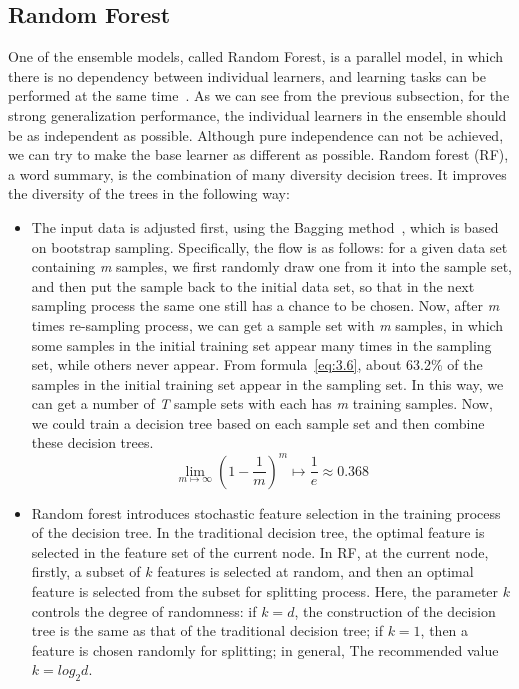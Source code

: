 \documentclass[master]{IPSstyle}
\begin{document}
{\subsection{Random Forest}
One of the ensemble models, called Random Forest, is a parallel model, in which there is no dependency between individual learners, and learning tasks can be performed at the same time~\cite{breiman2001random}. As we can see from the previous subsection, for the strong generalization performance, the individual learners in the ensemble should be as independent as possible. Although pure independence can not be achieved, we can try to make the base learner as different as possible. Random forest (RF), a word summary, is the combination of many diversity decision trees. It improves the diversity of the trees in the following way:
\begin{itemize}
\item The input data is adjusted first, using the Bagging method~\cite{breiman1996bagging}, which is based on bootstrap sampling. Specifically, the flow is as follows: for a given data set containing \textit{m} samples, we first randomly draw one from it into the sample set, and then put the sample back to the initial data set, so that in the next sampling process the same one still has a chance to be chosen. Now, after \textit{m} times re-sampling process, we can get a sample set with \textit{m} samples, in which some samples in the initial training set appear many times in the sampling set, while others never appear. From formula~\ref{eq:3.6}, about 63.2\% of the samples in the initial training set appear in the sampling set. In this way, we can get a number of \textit{T} sample sets with each has \textit{m} training samples. Now, we could train a decision tree based on each sample set and then combine these decision trees.
\begin{equation} \label{eq:3.9}
\lim_{m \mapsto \infty} \left(1 - \frac{1}{m}\right)^m \mapsto \frac{1}{e} \approx 0.368
\end{equation}
\item Random forest introduces stochastic feature selection in the training process of the decision tree. In the traditional decision tree, the optimal feature is selected in the feature set of the current node. In RF, at the current node, firstly, a subset of $k$ features is selected at random, and then an optimal feature is selected from the subset for splitting process. Here, the parameter $k$ controls the degree of randomness: if $k = d$, the construction of the decision tree is the same as that of the traditional decision tree; if $k = 1$, then a feature is chosen randomly for splitting; in general, The recommended value $k = log_2d$.
\end{itemize}

}
\end{document}
